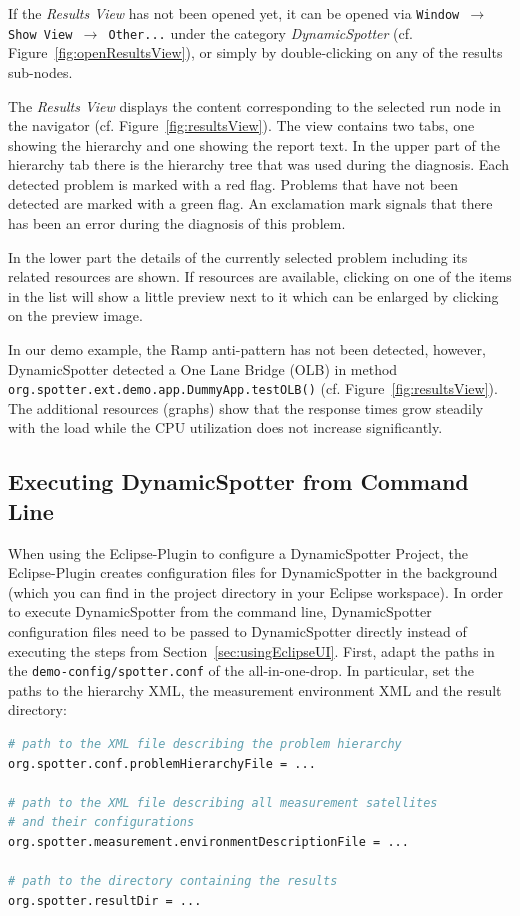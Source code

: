 \documentclass{report}
\newcommand{\DS}{DynamicSpotter }
\begin{document}
If the
\emph{Results View} has not been opened yet, it can be opened via \texttt{Window \(\rightarrow\) Show View
\(\rightarrow\) Other...} under the category \emph{\DS} (cf. Figure~\ref{fig:openResultsView}), or simply by
double-clicking on any of the results sub-nodes.

The \emph{Results View} displays the content corresponding to the selected run node in the navigator (cf.
Figure~\ref{fig:resultsView}).
The view contains two tabs, one showing the hierarchy and one showing the report text.
In the upper part of the hierarchy tab there is the hierarchy tree that was used during the diagnosis.
Each detected problem is marked with a red flag. Problems that have not been detected are marked with a green flag.
An exclamation mark signals that there has been an error during the diagnosis of this problem.

In the lower part the details of the currently selected problem including its related resources are shown.
If resources are available, clicking on one of the items in the list will show a little preview next to it which can be enlarged by clicking on the preview image.

In our demo example, the Ramp anti-pattern has not been detected, however, \DS detected a One Lane Bridge (OLB) in
method \texttt{org.spotter.ext.demo.app.DummyApp.testOLB()} (cf. Figure~\ref{fig:resultsView}). The additional resources
(graphs) show that the response times grow steadily with the load while the CPU utilization does not increase
significantly.


\subsection{Executing \DS from Command Line}
\label{sec:usingCommandLine}
When using the Eclipse-Plugin to configure a \DS Project, the Eclipse-Plugin creates configuration files for \DS in the
background (which you can find in the project directory in your Eclipse workspace).
In order to execute \DS from the command line, \DS configuration files need to be passed to \DS directly instead of
executing the steps from Section~\ref{sec:usingEclipseUI}. 
First, adapt the paths in the \texttt{demo-config/spotter.conf} of the all-in-one-drop. In particular, set the paths to
the hierarchy XML, the measurement environment XML and the result directory:
\begin{lstlisting}[language=sh,morekeywords={java,javaagent,port, rootDir}, frame=single]
# path to the XML file describing the problem hierarchy
org.spotter.conf.problemHierarchyFile = ...

# path to the XML file describing all measurement satellites 
# and their configurations
org.spotter.measurement.environmentDescriptionFile = ...

# path to the directory containing the results
org.spotter.resultDir = ...
\end{lstlisting}
\end{document}
